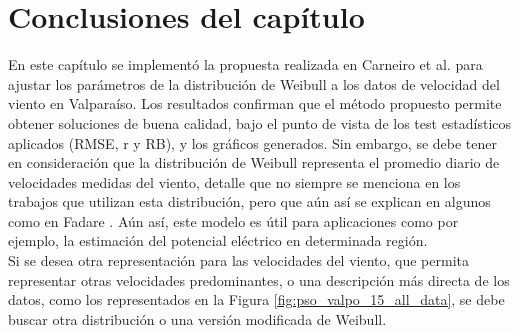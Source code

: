\newpage
\section{Conclusiones del capítulo}
En este capítulo se implementó la propuesta realizada en Carneiro et al. \cite{Carneiro15} para ajustar los parámetros de la distribución de Weibull a los datos de velocidad del viento en Valparaíso. Los resultados confirman que el método propuesto permite obtener soluciones de buena calidad, bajo el punto de vista de los test estadísticos aplicados (RMSE, r y RB), y los gráficos generados. Sin embargo, se debe tener en consideración que la distribución de Weibull representa el promedio diario de velocidades medidas del viento, detalle que no siempre se menciona en los trabajos que utilizan esta distribución, pero que aún así se explican en algunos como en Fadare \cite{Fadare08}. Aún así, este modelo es útil para aplicaciones como por ejemplo, la estimación del potencial eléctrico en determinada región.\\
Si se desea otra representación para las velocidades del viento, que permita representar otras velocidades predominantes, o una descripción más directa de los datos, como los representados en la Figura \ref{fig:pso_valpo_15_all_data}, se debe buscar otra distribución o una versión modificada de Weibull.